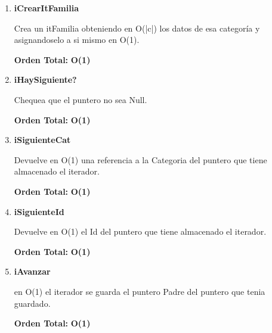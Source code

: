 \vspace*{1em}
\begin{enumerate}

\item\textbf{iCrearItFamilia}
\par Crea un itFamilia obteniendo en O(|c|) los datos de esa categoría y asignandoselo a si mismo en O(1).
\par \textbf{Orden Total:} \textbf{O(1)}

\item\textbf{iHaySiguiente?}
\par Chequea que el puntero no sea Null.
\par \textbf{Orden Total:} \textbf{O(1)}

\item\textbf{iSiguienteCat}
\par Devuelve en O(1) una referencia a la Categoria del puntero que tiene almacenado el iterador.
\par \textbf{Orden Total:} \textbf{O(1)}

\item\textbf{iSiguienteId}
\par Devuelve en O(1) el Id del puntero que tiene almacenado el iterador.
\par \textbf{Orden Total:} \textbf{O(1)}

\item\textbf{iAvanzar}
\par en O(1) el iterador se guarda el puntero Padre del puntero que tenia guardado.
\par \textbf{Orden Total:} \textbf{O(1)}

\end{enumerate}



